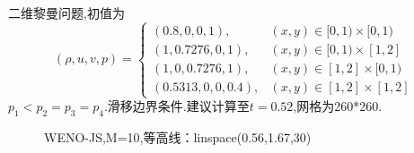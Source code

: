 \documentclass{book}
\begin{document}
\begin{example}[二维欧拉方程黎曼问题]{}{}
    二维黎曼问题\cite{RN13},初值为
    \begin{equation}
        (\rho, u, v, p)=\begin{cases}
            (0.8,0,0,1),      & (x, y) \in[0,1) \times[0,1) \\
            (1,0.7276,0,1),   & (x, y) \in[0,1) \times[1,2] \\
            (1,0,0.7276,1),   & (x, y) \in[1,2] \times[0,1) \\
            (0.5313,0,0,0.4), & (x, y) \in[1,2] \times[1,2]
        \end{cases}
    \end{equation}
    $p_1<p_2=p_3=p_4$.滑移边界条件.建议计算至$t=0.52$,网格为260*260.

    \begin{figure}[H]%
        \centering
        \quad
        \caption{WENO-JS,M=10,等高线：linspace(0.56,1.67,30)}
    \end{figure}
\end{example}
\end{document}
